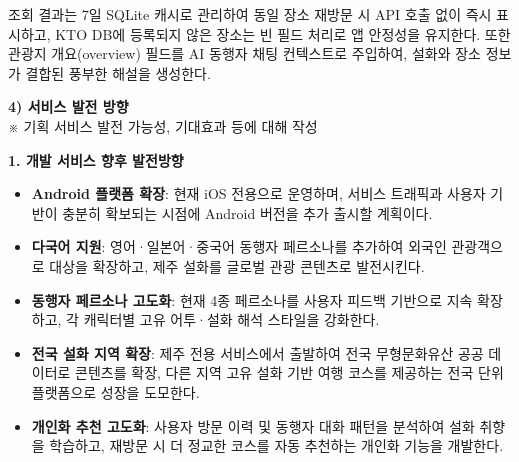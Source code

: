 \documentclass[12pt,a4paper]{article}
\newcommand{\sectionheader}[2]{%
  \vspace{3mm}%
  \noindent\colorbox{sectiongray}{%
    \parbox{\dimexpr\textwidth-2\fboxsep\relax}{%
      \vspace{2pt}%
      \textbf{#1}\\%
      {\small #2}%
      \vspace{2pt}%
    }%
  }%
  \vspace{2mm}%
}
\begin{document}
조회 결과는 7일 SQLite 캐시로 관리하여 동일 장소 재방문 시 API 호출 없이 즉시 표시하고, KTO DB에 등록되지 않은 장소는 빈 필드 처리로 앱 안정성을 유지한다. 또한 관광지 개요(overview) 필드를 AI 동행자 채팅 컨텍스트로 주입하여, 설화와 장소 정보가 결합된 풍부한 해설을 생성한다.

\vspace{2mm}

\sectionheader{4) 서비스 발전 방향}{※ 기획 서비스 발전 가능성, 기대효과 등에 대해 작성}

\textbf{1. 개발 서비스 향후 발전방향}

\begin{itemize}
  \item \textbf{Android 플랫폼 확장}: 현재 iOS 전용으로 운영하며, 서비스 트래픽과 사용자 기반이 충분히 확보되는 시점에 Android 버전을 추가 출시할 계획이다.
  \item \textbf{다국어 지원}: 영어·일본어·중국어 동행자 페르소나를 추가하여 외국인 관광객으로 대상을 확장하고, 제주 설화를 글로벌 관광 콘텐츠로 발전시킨다.
  \item \textbf{동행자 페르소나 고도화}: 현재 4종 페르소나를 사용자 피드백 기반으로 지속 확장하고, 각 캐릭터별 고유 어투·설화 해석 스타일을 강화한다.
  \item \textbf{전국 설화 지역 확장}: 제주 전용 서비스에서 출발하여 전국 무형문화유산 공공 데이터로 콘텐츠를 확장, 다른 지역 고유 설화 기반 여행 코스를 제공하는 전국 단위 플랫폼으로 성장을 도모한다.
  \item \textbf{개인화 추천 고도화}: 사용자 방문 이력 및 동행자 대화 패턴을 분석하여 설화 취향을 학습하고, 재방문 시 더 정교한 코스를 자동 추천하는 개인화 기능을 개발한다.
\end{itemize}
\end{document}
